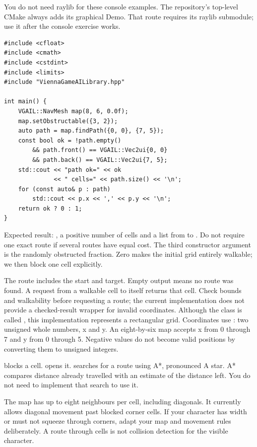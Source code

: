 \documentclass[11pt,a4paper]{article}
\begin{document}
You do not need raylib for these console examples. The repository's top-level CMake always adds its graphical Demo. That route requires its raylib submodule; use it after the console exercise works.
\begin{lstlisting}
#include <cfloat>
#include <cmath>
#include <cstdint>
#include <limits>
#include "ViennaGameAILibrary.hpp"

int main() {
    VGAIL::NavMesh map(8, 6, 0.0f);
    map.setObstructable({3, 2});
    auto path = map.findPath({0, 0}, {7, 5});
    const bool ok = !path.empty()
        && path.front() == VGAIL::Vec2ui{0, 0}
        && path.back() == VGAIL::Vec2ui{7, 5};
    std::cout << "path ok=" << ok
              << " cells=" << path.size() << '\n';
    for (const auto& p : path)
        std::cout << p.x << ',' << p.y << '\n';
    return ok ? 0 : 1;
}
\end{lstlisting}
Expected result: , a positive number of cells and a list from  to . Do not require one exact route if several routes have equal cost. The third constructor argument is the randomly obstructed fraction. Zero makes the initial grid entirely walkable; we then block one cell explicitly.

The route includes the start and target. Empty output means no route was found. A request from a walkable cell to itself returns that cell. Check bounds and walkability before requesting a route; the current implementation does not provide a checked-result wrapper for invalid coordinates.
Although the class is called , this implementation represents a rectangular grid. Coordinates use : two unsigned whole numbers, x and y. An eight-by-six map accepts x from 0 through 7 and y from 0 through 5. Negative values do not become valid positions by converting them to unsigned integers.

 blocks a cell.  opens it.  searches for a route using A*, pronounced A star. A* compares distance already travelled with an estimate of the distance left. You do not need to implement that search to use it.

The map has up to eight neighbours per cell, including diagonals. It currently allows diagonal movement past blocked corner cells. If your character has width or must not squeeze through corners, adapt your map and movement rules deliberately. A route through cells is not collision detection for the visible character.
\end{document}
